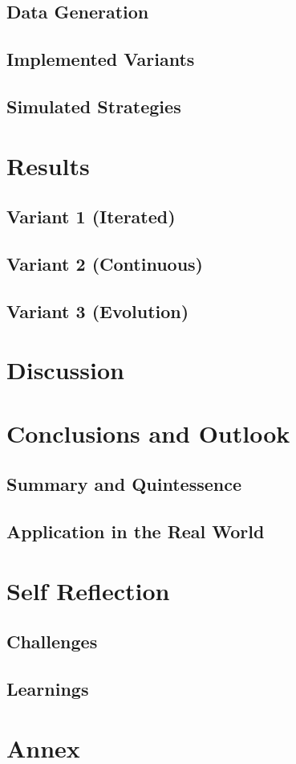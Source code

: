 \documentclass[10pt, a4paper, twocolomn]{article}
\begin{document}
	\subsection{Data Generation}
	\subsection{Implemented Variants}
	\subsection{Simulated Strategies}
	
\section{Results}
	\subsection{Variant 1 (Iterated)}
	\subsection{Variant 2 (Continuous)}
	\subsection{Variant 3 (Evolution)}

\section{Discussion}

\section{Conclusions and Outlook}
	\subsection{Summary and Quintessence}
	\subsection{Application in the Real World}

\section{Self Reflection}
	\subsection{Challenges}
	\subsection{Learnings}

\section{Annex}
\end{document}
